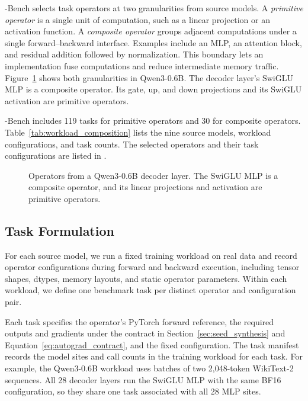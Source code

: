 \system-Bench selects task operators at two granularities from source models. A \emph{primitive operator} is a single unit of computation, such as a linear projection or an activation function. A \emph{composite operator} groups adjacent computations under a single forward--backward interface. Examples include an MLP, an attention block, and residual addition followed by normalization. This boundary lets an implementation fuse computations and reduce intermediate memory traffic. Figure~\ref{fig:task} shows both granularities in Qwen3-0.6B. The decoder layer's SwiGLU MLP is a composite operator. Its gate, up, and down projections and its SwiGLU activation are primitive operators.

\system-Bench includes 119 tasks for primitive operators and 30 for composite operators. Table~\ref{tab:workload_composition} lists the nine source models, workload configurations, and task counts. The selected operators and their task configurations are listed in .

\begin{figure}[t]
    \centering
    
    \caption{Operators from a Qwen3-0.6B decoder layer. The SwiGLU MLP is a composite operator, and its linear projections and activation are primitive operators.}
    \label{fig:task}
\end{figure}


\subsection{Task Formulation}

\label{sec:target_preparation}
\label{sec:workload_configs}
For each source model, we run a fixed training workload on real data and record operator configurations during forward and backward execution, including tensor shapes, dtypes, memory layouts, and static operator parameters. Within each workload, we define one benchmark task per distinct operator and configuration pair.

Each task specifies the operator's PyTorch forward reference, the required outputs and gradients under the contract in Section~\ref{sec:seed_synthesis} and Equation~\ref{eq:autograd_contract}, and the fixed configuration. The task manifest records the model sites and call counts in the training workload for each task. For example, the Qwen3-0.6B workload uses batches of two 2,048-token WikiText-2 sequences. All 28 decoder layers run the SwiGLU MLP with the same BF16 configuration, so they share one task associated with all 28 MLP sites.

